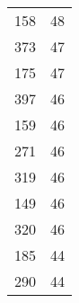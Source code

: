\begin{table}[h!]
\begin{tabular}{lr}
158                          &  48 \\
373                          &  47 \\
175                          &  47 \\
397                          &  46 \\
159                          &  46 \\
271                          &  46 \\
319                          &  46 \\
149                          &  46 \\
320                          &  46 \\
185                          &  44 \\
290                          &  44 \\
\bottomrule
\end{tabular}
\end{table}
